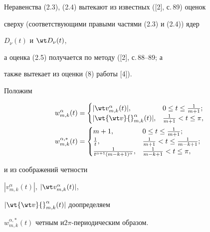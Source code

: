 Неравенства (2.3), (2.4) вытекают из известных ([2], с.\,89) оценок 


сверху (соответствующими правыми частями (2.3) и (2.4)) ядер


$D_\nu (t)$ и $\wt D_\nu (t)$,


а оценка (2.5) получается по методу ([2], с.\,88--89; а


также вытекает из оценки (8) работы [4]).





Положим


\begin{align}


w_{m,k}^{\alpha}(t)&=


\begin{cases}


|\wt v_{m,k}^{\alpha}(t)|, & 0\le t \le \frac{1}{m+1};\\


|\wt{\wt v}{}_{m,k}^{\alpha}(t)|, & \frac{1}{m+1}<t \le \pi,


\end{cases}


\\


%


w_{m,k}^{{\alpha},*}(t)&=


\begin{cases}


m+1, & 0\le t \le \frac{1}{m+1};\\


\frac {1}{t}, & \frac{1}{m+1}<t \le \frac{1}{m-k+1};\\


\frac {1}{t^{\alpha+1}(m-k+1)^{\alpha}}, & \frac{1}{m-k+1}<t \le \pi,


\end{cases}


\end{align}


и из соображений четности


$|v_{m,k}^{\alpha}(t)|$, $|\wt v_{m,k}^{\alpha}(t)|$, 


$|\wt{\wt v}{}_{m,k}^{\alpha}(t)|$ доопределяем


$w_{m,k}^{{\alpha},*}(t)$ четным и\linebreak $2\pi$-периодическим образом.








